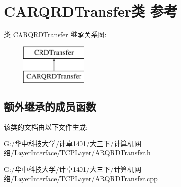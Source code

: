 \hypertarget{class_c_a_r_q_r_d_transfer}{}\section{C\+A\+R\+Q\+R\+D\+Transfer类 参考}
\label{class_c_a_r_q_r_d_transfer}
类 C\+A\+R\+Q\+R\+D\+Transfer 继承关系图\+:\begin{figure}[H]
\begin{center}
\leavevmode
\includegraphics[height=2.000000cm]{class_c_a_r_q_r_d_transfer}
\end{center}
\end{figure}
\subsection*{额外继承的成员函数}


该类的文档由以下文件生成\+:\begin{DoxyCompactItemize}
\item 
G\+:/华中科技大学/计卓1401/大三下/计算机网络/\+Layer\+Interface/\+T\+C\+P\+Layer/A\+R\+Q\+R\+D\+Transfer.\+h\item 
G\+:/华中科技大学/计卓1401/大三下/计算机网络/\+Layer\+Interface/\+T\+C\+P\+Layer/A\+R\+Q\+R\+D\+Transfer.\+cpp\end{DoxyCompactItemize}
